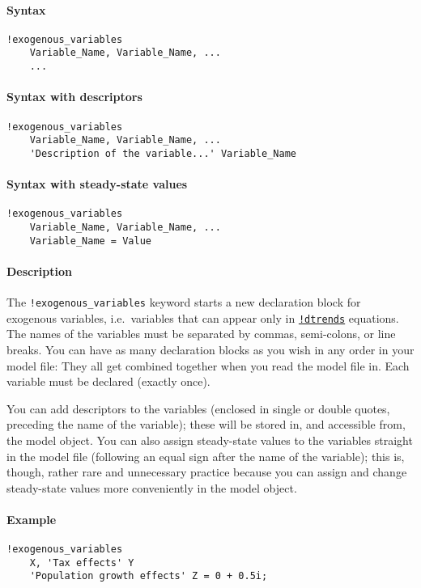 


	\paragraph{Syntax}

\begin{verbatim}
!exogenous_variables
    Variable_Name, Variable_Name, ...
    ...
\end{verbatim}

\paragraph{Syntax with descriptors}

\begin{verbatim}
!exogenous_variables
    Variable_Name, Variable_Name, ...
    'Description of the variable...' Variable_Name
\end{verbatim}

\paragraph{Syntax with steady-state
values}

\begin{verbatim}
!exogenous_variables
    Variable_Name, Variable_Name, ...
    Variable_Name = Value
\end{verbatim}

\paragraph{Description}

The \texttt{!exogenous\_variables} keyword starts a new declaration
block for exogenous variables, i.e.~variables that can appear only in
\href{modellang/dtrends}{\texttt{!dtrends}} equations. The names of the
variables must be separated by commas, semi-colons, or line breaks. You
can have as many declaration blocks as you wish in any order in your
model file: They all get combined together when you read the model file
in. Each variable must be declared (exactly once).

You can add descriptors to the variables (enclosed in single or double
quotes, preceding the name of the variable); these will be stored in,
and accessible from, the model object. You can also assign steady-state
values to the variables straight in the model file (following an equal
sign after the name of the variable); this is, though, rather rare and
unnecessary practice because you can assign and change steady-state
values more conveniently in the model object.

\paragraph{Example}

\begin{verbatim}
!exogenous_variables
    X, 'Tax effects' Y
    'Population growth effects' Z = 0 + 0.5i;
\end{verbatim}


